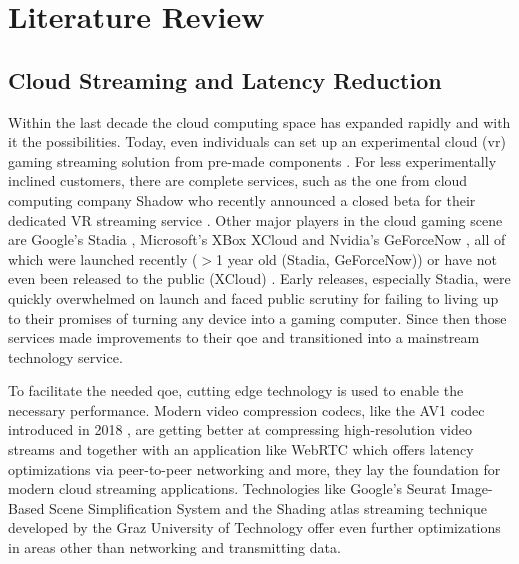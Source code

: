 \section{Literature Review}
\label{sec:lit}

\subsection{Cloud Streaming and Latency Reduction}
Within the last decade the cloud computing space has expanded rapidly and with it the possibilities. Today, even individuals can set up an experimental cloud (\acrfull{vr}) gaming streaming solution from pre-made components \parencite{tayoexe} \parencite{clouddesktopguide}. For less experimentally inclined customers, there are complete services, such as the one from cloud computing company Shadow \parencite{shadow} who recently announced a closed beta for their dedicated VR streaming service \parencite{shadowvr}. Other major players in the cloud gaming scene are Google's Stadia \parencite{stadia}, Microsoft's XBox XCloud \parencite{xcloud} and Nvidia's GeForceNow \parencite{geforcenow}, all of which were launched recently ($>$1 year old (Stadia, GeForceNow)) or have not even been released to the public (XCloud) . Early releases, especially Stadia, were quickly overwhelmed on launch and faced public scrutiny for failing to living up to their promises of turning any device into a gaming computer. Since then those services made improvements to their \acrfull{qoe} and transitioned into a mainstream technology service.

To facilitate the needed \acrshort{qoe}, cutting edge technology is used to enable the necessary performance. Modern video compression codecs, like the AV1 codec introduced in 2018 \parencite{av1}, are getting better at compressing high-resolution video streams and together with an application like WebRTC \parencite{webRTC} which offers latency optimizations via peer-to-peer networking and more, they lay the foundation for modern cloud streaming applications. Technologies like Google's Seurat Image\hyp{}Based Scene Simplification System \parencite{seurat} and the Shading atlas streaming technique developed by the Graz University of Technology \parencite{sas} offer even further optimizations in areas other than networking and transmitting data. 

